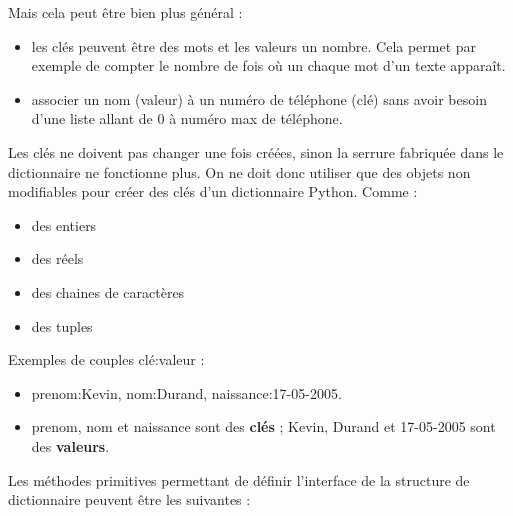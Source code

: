 \documentclass[
  a4paper,
  DIV=11,
  numbers=noendperiod]{scrartcl}
\providecommand{\tightlist}{%
  \setlength{\itemsep}{0pt}\setlength{\parskip}{0pt}}\usepackage{longtable,booktabs,array}
\begin{document}
Mais cela peut être bien plus général :

\begin{itemize}
\tightlist
\item
  les clés peuvent être des mots et les valeurs un nombre. Cela permet
  par exemple de compter le nombre de fois où un chaque mot d'un texte
  apparaît.
\item
  associer un nom (valeur) à un numéro de téléphone (clé) sans avoir
  besoin d'une liste allant de 0 à numéro max de téléphone.
\end{itemize}

Les clés ne doivent pas changer une fois créées, sinon la serrure
fabriquée dans le dictionnaire ne fonctionne plus. On ne doit donc
utiliser que des objets non modifiables pour créer des clés d'un
dictionnaire Python. Comme :

\begin{itemize}
\tightlist
\item
  des entiers
\item
  des réels
\item
  des chaines de caractères
\item
  des tuples
\end{itemize}

\begin{tcolorbox}[enhanced jigsaw, rightrule=.15mm, left=2mm, leftrule=.75mm, arc=.35mm, opacitybacktitle=0.6, colbacktitle=quarto-callout-caution-color!10!white, breakable, colback=white, toptitle=1mm, opacityback=0, toprule=.15mm, bottomrule=.15mm, title=\textcolor{quarto-callout-caution-color}{\faFire}\hspace{0.5em}{Exemple}, titlerule=0mm, bottomtitle=1mm, coltitle=black]

Exemples de couples clé:valeur :

\begin{itemize}
\tightlist
\item
  prenom:Kevin, nom:Durand, naissance:17-05-2005.
\item
  prenom, nom et naissance sont des \textbf{clés} ; Kevin, Durand et
  17-05-2005 sont des \textbf{valeurs}.
\end{itemize}

\end{tcolorbox}

Les méthodes primitives permettant de définir l'interface de la
structure de dictionnaire peuvent être les suivantes :
\end{document}
